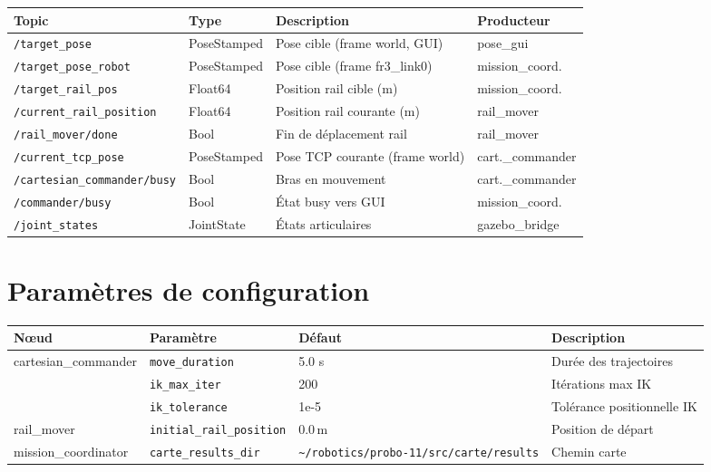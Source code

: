 \documentclass[11pt, a4paper]{article}
\newcommand{\topic}[1]{\texttt{\color{AccentOrange}#1}}
\begin{document}
\begin{center}
\small
\begin{tabularx}{\textwidth}{llXl}
  \toprule
  \rowcolor{LightBlue}
  \textbf{Topic} & \textbf{Type} & \textbf{Description} & \textbf{Producteur} \\
  \midrule
  \topic{/target\_pose}           & PoseStamped & Pose cible (frame world, GUI)       & pose\_gui \\
  \topic{/target\_pose\_robot}    & PoseStamped & Pose cible (frame fr3\_link0)       & mission\_coord. \\
  \topic{/target\_rail\_pos}      & Float64     & Position rail cible (m)             & mission\_coord. \\
  \topic{/current\_rail\_position}& Float64     & Position rail courante (m)          & rail\_mover \\
  \topic{/rail\_mover/done}       & Bool        & Fin de déplacement rail             & rail\_mover \\
  \topic{/current\_tcp\_pose}     & PoseStamped & Pose TCP courante (frame world)     & cart.\_commander \\
  \topic{/cartesian\_commander/busy} & Bool     & Bras en mouvement                   & cart.\_commander \\
  \topic{/commander/busy}         & Bool        & État busy vers GUI                  & mission\_coord. \\
  \topic{/joint\_states}          & JointState  & États articulaires                  & gazebo\_bridge \\
  \bottomrule
\end{tabularx}
\end{center}

\section{Paramètres de configuration}

\begin{center}
\begin{tabular}{llll}
  \toprule
  \rowcolor{LightTeal}
  \textbf{Nœud} & \textbf{Paramètre} & \textbf{Défaut} & \textbf{Description} \\
  \midrule
  \multirow{3}{*}{cartesian\_commander}
    & \texttt{move\_duration}  & 5.0 s  & Durée des trajectoires \\
    & \texttt{ik\_max\_iter}   & 200    & Itérations max IK \\
    & \texttt{ik\_tolerance}   & 1e-5   & Tolérance positionnelle IK \\
  \midrule
  rail\_mover
    & \texttt{initial\_rail\_position} & 0.0\,m & Position de départ \\
  \midrule
  mission\_coordinator
    & \texttt{carte\_results\_dir} & \texttt{\textasciitilde/robotics/probo-11/src/carte/results} & Chemin carte \\
  \bottomrule
\end{tabular}
\end{center}
\end{document}
